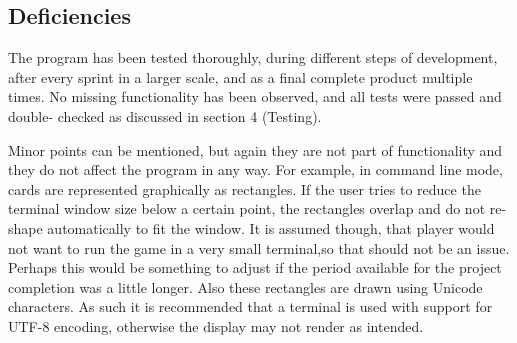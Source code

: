 \newpage
\subsection{Deficiencies}

The program has been tested thoroughly, during different steps of development, after every sprint in a larger scale, and as a final complete product multiple times. No missing functionality has been observed, and all tests were passed and double- checked as discussed in section 4 (Testing). 

Minor points can be mentioned, but again they are not part of functionality and they do not affect the program in any way. For example, in command line mode, cards are represented graphically as rectangles. If the user tries to reduce the terminal window size below a certain point, the rectangles overlap and do not re-shape automatically to fit the window. It is assumed though, that player would not want to run the game in a very small terminal,so that should not be an issue. Perhaps this would be something to adjust if the period available for the project completion was a little longer. Also these rectangles are drawn using Unicode characters. As such it is recommended that a terminal is used with support for UTF-8 encoding, otherwise the display may not render as intended.
